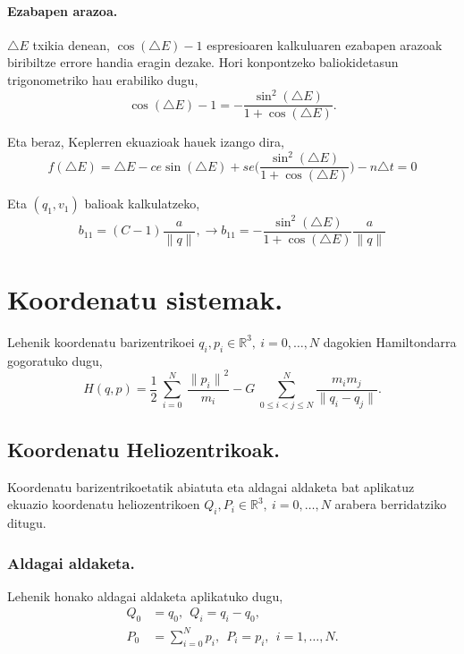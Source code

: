 \paragraph*{Ezabapen arazoa.} $\triangle E$ txikia denean, $\cos(\triangle E)-1$ espresioaren kalkuluaren ezabapen arazoak biribiltze errore handia eragin dezake. Hori konpontzeko baliokidetasun trigonometriko hau erabiliko dugu,
\begin{equation*}
\cos(\triangle E)-1=-\frac{\sin^2(\triangle E)}{1+\cos(\triangle E)}.
\end{equation*}  

Eta beraz, Keplerren ekuazioak hauek izango dira,
\begin{equation*}
f(\triangle E)=\triangle E - ce \sin(\triangle E)+ se \bigg(\frac{\sin^2(\triangle E)}{1+\cos(\triangle E)}\bigg)-n \triangle t=0
\end{equation*}

Eta $(q_1,v_1)$ balioak kalkulatzeko,
\begin{equation*}
b_{11}=(C-1) \frac{a}{\|q\|}, \longrightarrow b_{11}=-\frac{\sin^2(\triangle E)}{1+\cos(\triangle E)} \frac{a}{\|q\|}
\end{equation*}

\section{Koordenatu sistemak.}
\label{erans:B2}

Lehenik koordenatu barizentrikoei $q_i, p_i \in \mathbb{R}^3, \ i=0,\dots,N$ dagokien Hamiltondarra gogoratuko dugu,
\begin{equation}
H(q,p)=\frac{1}{2}\ \sum^N_{i=0}{\ \frac{{\|p_i\|}^2}{m_i}}-G\ \sum^N_{0\le i<j\le N}{\frac{m_im_j}{\|q_i-q_j\|}}.
\end{equation}

\subsection*{Koordenatu Heliozentrikoak.}

Koordenatu barizentrikoetatik abiatuta eta aldagai aldaketa bat aplikatuz ekuazio koordenatu heliozentrikoen $Q_i,P_i \in \mathbb{R}^3, \ i=0,\dots,N$ 
arabera berridatziko ditugu. 

\subsubsection*{Aldagai aldaketa.}
Lehenik honako aldagai aldaketa aplikatuko dugu,
\begin{align*}
Q_0 &=q_0, \ \ Q_i=q_i-q_0, \\ 
P_0 &=\sum\limits_{i=0}^{N}p_i, \ \ P_i=p_i, \ \ i=1,\dots{,N}.
\end{align*}

